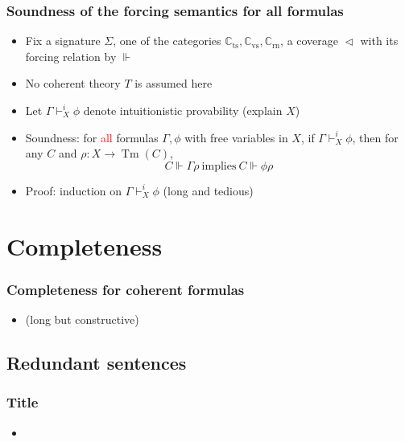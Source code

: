 \documentclass[handout,11pt]{beamer}
\newcommand{\red}[1]{\textcolor{red}{#1}}
\newcommand{\covd}{\mathrel{\vartriangleleft}}
\newcommand*{\subvs}{_{\mathrm{vs}}}
\newcommand*{\subrn}{_{\mathrm{rn}}}
\newcommand*{\subts}{_{\mathrm{ts}}}
\newcommand{\Cvs}{\mathbb{C}\subvs}
\newcommand{\Crn}{\mathbb{C}\subrn}
\newcommand{\Cts}{\mathbb{C}\subts}
\DeclareMathOperator{\Tm}{Tm}
\begin{document}
\begin{frame}
\frametitle{Soundness of the forcing semantics for all formulas}
\begin{itemize}[<+->]
 \item Fix a signature $\Sigma$, one of the categories $\Cts,\Cvs,\Crn$, 
 a coverage $\covd$ with its forcing relation by $\Vdash$
 \item No coherent theory $T$ is assumed here
 \item Let $\Gamma\vdash_X^i \phi$ denote intuitionistic 
 provability (explain $X$) 
 \item Soundness: for \red{all} formulas $\Gamma,\phi$ 
 with free variables in $X$, if $\Gamma\vdash_X^i \phi$, then for any $C$
 and $\rho: X\to\Tm(C)$, 
 $$C\Vdash \Gamma\rho~\text{implies}~C\Vdash \phi\rho$$
 \item Proof: induction on $\Gamma\vdash_X^i \phi$ (long and tedious)
 \end{itemize}
\end{frame}

\section{Completeness}

\begin{frame}
\frametitle{Completeness for coherent formulas}
 \begin{itemize}[<+->]
    \item (long but constructive)
 \end{itemize}
\end{frame}

\subsection{Redundant sentences}

\begin{frame}
\frametitle{Title}
 \begin{itemize}[<+->]
    \item 
 \end{itemize}
\end{frame}
\end{document}
